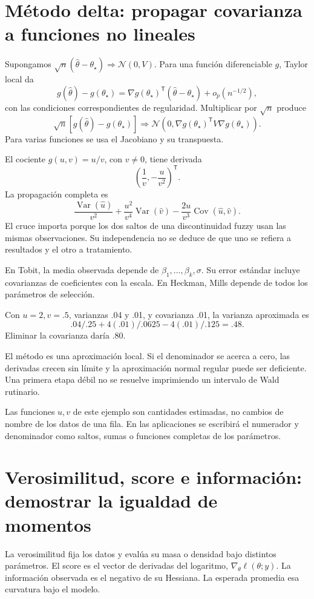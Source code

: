 \documentclass[11pt,a4paper]{article}
\newcommand{\T}{^{\mathsf T}}
\DeclareMathOperator{\Var}{Var}
\DeclareMathOperator{\Cov}{Cov}
\begin{document}
\clearpage
\section{Método delta: propagar covarianza a funciones no lineales}\label{unidad13}
Supongamos
\(\sqrt n(\widehat\theta-\theta_\star)
\Rightarrow\mathcal N(0,V)\).
Para una función diferenciable \(g\), Taylor local da
\[
g(\widehat\theta)-g(\theta_\star)
=\nabla g(\theta_\star)\T(\widehat\theta-\theta_\star)
+o_p(n^{-1/2}),
\]
con las condiciones correspondientes de regularidad.
Multiplicar por \(\sqrt n\) produce
\[
\sqrt n[g(\widehat\theta)-g(\theta_\star)]
\Rightarrow\mathcal N
\left(0,\nabla g(\theta_\star)\T V\nabla g(\theta_\star)\right).
\]
Para varias funciones se usa el Jacobiano y su transpuesta.

El cociente \(g(u,v)=u/v\), con \(v\ne0\), tiene derivada
\[
\left(\frac1v,-\frac u{v^2}\right)\T.
\]
La propagación completa es
\[
\frac{\Var(\widehat u)}{v^2}
+\frac{u^2}{v^4}\Var(\widehat v)
-\frac{2u}{v^3}\Cov(\widehat u,\widehat v).
\]
El cruce importa porque los dos saltos de una
discontinuidad fuzzy usan las mismas observaciones.
Su independencia no se deduce de que uno
se refiera a resultados y el otro a tratamiento.

En Tobit, la media observada depende de
\(\beta_1,\ldots,\beta_k,\sigma\).
Su error estándar incluye covarianzas de
coeficientes con la escala.
En Heckman, Mills depende de todos los
parámetros de selección.

\begin{ejemplo}
Con \(u=2,v=.5\), varianzas .04 y .01,
y covarianza .01, la varianza aproximada es
\[
.04/.25+4(.01)/.0625-4(.01)/.125=.48.
\]
Eliminar la covarianza daría .80.
\end{ejemplo}
El método es una aproximación local.
Si el denominador se acerca a cero,
las derivadas crecen sin límite y la
aproximación normal regular puede ser deficiente.
Una primera etapa débil no se resuelve
imprimiendo un intervalo de Wald rutinario.

Las funciones \(u,v\) de este ejemplo son
cantidades estimadas, no cambios de nombre
de los datos de una fila.
En las aplicaciones se escribirá el numerador
y denominador como saltos, sumas o funciones
completas de los parámetros.

\clearpage
\section{Verosimilitud, score e información: demostrar la igualdad de momentos}\label{unidad14}
La verosimilitud fija los datos y evalúa
su masa o densidad bajo distintos parámetros.
El score es el vector de derivadas del logaritmo,
\(\nabla_\theta\ell(\theta;y)\).
La información observada es el negativo de su Hessiana.
La esperada promedia esa curvatura bajo el modelo.
\end{document}
